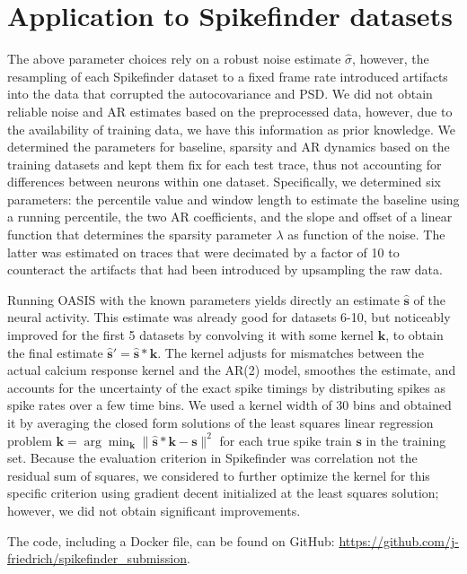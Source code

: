 \documentclass[11pt,a4paper]{article}
\begin{document}
\section{Application to Spikefinder datasets}

The above parameter choices rely on a robust noise estimate $\hat{\sigma}$, however, the resampling of each Spikefinder dataset to a fixed frame rate introduced artifacts into the data that corrupted the autocovariance and PSD. %
We did not obtain reliable noise and AR estimates based on the preprocessed data, however, due to the availability of training data, we have this information as prior knowledge. 
We determined the parameters for baseline, sparsity and AR dynamics based on the training datasets and kept them fix for each test trace, thus not accounting for differences between neurons within one dataset. Specifically, we determined six parameters: the percentile value and window length to estimate the baseline using a running percentile, the two AR coefficients, and the slope and offset of a linear function that determines the sparsity parameter $\lambda$ as function of the noise. The latter was estimated on traces that were decimated by a factor of 10 to counteract the artifacts that had been introduced by upsampling the raw data.

Running OASIS with the known parameters yields directly an estimate $\hat{\bm s}$ of the neural activity. This estimate was already good for datasets 6-10, but noticeably improved for the first 5 datasets by convolving it with some kernel $\bm k$, to obtain the final estimate $\hat{\bm s}'=\hat{\bm s}*\bm k$. The kernel adjusts for mismatches between the actual calcium response kernel and the AR(2) model, smoothes the estimate, and accounts for the uncertainty of the exact spike timings by distributing spikes as spike rates over a few time bins. We used a kernel width of $30$ bins and obtained it by averaging the closed form solutions of the least squares linear regression problem $\bm k = \arg\min_{\bm k} \|\hat{\bm s}*\bm k-\bm s\|^2$ for each true spike train $\bm s$ in the training set.
Because the evaluation criterion in Spikefinder was correlation not the residual sum of squares, we considered to further optimize the kernel for this specific criterion using gradient decent initialized at the least squares solution; however, we did not obtain significant improvements.

The code, including a Docker file, can be found on GitHub: \href{https://github.com/j-friedrich/spikefinder_submission}{https://github.com/j-friedrich/spikefinder\_submission}.
 



\end{document}
